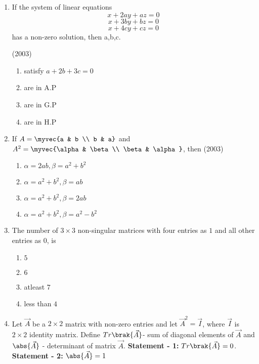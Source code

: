 	\begin{enumerate}
\item
	If the system of linear equations $$x+2ay+az = 0$$ $$x+3by+bz = 0$$ $$x+4cy+cz = 0$$ has a non-zero solution, then a,b,c.

	\hfill (2003)

\begin{multicols}{2}
	\begin{enumerate}
                \item satisfy $a+ 2b+3c = 0$
                \item are in A.P
                \item are in G.P
                \item are in H.P
        \end{enumerate} 	
\end{multicols}
%
\item
        If $A=\myvec{a & b \\ b & a}$ and $A^{2}=\myvec{\alpha & \beta \\ \beta & \alpha}$, then 
	\hfill (2003)
\begin{multicols}{2}
        \begin{enumerate}
		\item $\alpha=2ab, \beta=a^{2}+b^{2}$
                \item $\alpha=a^{2}+b^{2}, \beta=ab$
                \item $\alpha=a^{2}+b^{2}, \beta=2ab$
                \item $\alpha=a^{2}+b^{2}, \beta=a^{2}-b^{2}$
        \end{enumerate}
\end{multicols}
%
\newcommand{\adj}[1]{$adj\brak{#1}$}
%
    \item The number of $3\times3$ non-singular matrices with four entries as $1$ and all other entries as $0$, is 
	\hfill{}{\par}
%
\begin{multicols}{4}
	\begin{enumerate}
                \item $5$ 
		\item $6$
		\item atleast $7$
		\item less than $4$ 
	\end{enumerate}
\end{multicols}
    \item Let $\vec{A}$ be a $2\times2$ matrix with non-zero entries and let $\vec{A}^2 = \vec{I}$, where $\vec{I}$ is $2\times2$ identity matrix. Define 
	\newline
	$Tr\brak{\vec{A}}$- sum of diagonal elements of $\vec{A}$ and
	\newline
	$\abs{\vec{A}}$ - determinant of matrix $\vec{A}$.
	\newline
	\textbf{Statement - 1:} $Tr\brak{\vec{A}} = 0$.
	\newline
	\textbf{Statement - 2:} $\abs{\vec{A}} = 1$


\end{enumerate}
